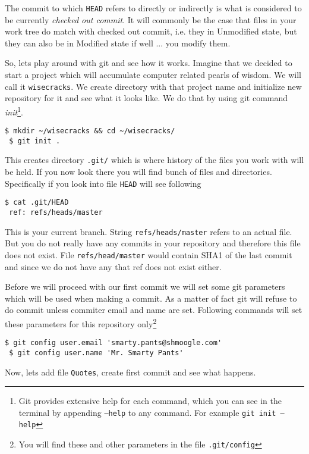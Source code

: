 \documentclass{article}
\theoremstyle{definition}
\begin{document}
        \noindent The commit to which \texttt{HEAD} refers to directly or indirectly is what is considered to be currently
        {\em checked out commit}. It will commonly be the case that files in your work tree do match with checked out
        commit, i.e. they in Unmodified state, but they can also be in Modified state if well ... you modify them.

        So, lets play around with git and see how it works. Imagine that we decided to start a project which will
        accumulate computer related pearls of wisdom. We will call it \texttt{wisecracks}. We create directory with that
        project name and initialize new repository for it and see what it looks like. We do that by using git command
        {\em init}\footnote{Git provides extensive help for each command, which you can see in the terminal by
        appending \texttt{--help} to any command. For example \texttt{git init --help}}.

        \begin{Verbatim}[frame=single]
 $ mkdir ~/wisecracks && cd ~/wisecracks/
 $ git init .
        \end{Verbatim}
        This creates directory \texttt{.git/} which is where history of the files you work with will be held. If you now
        look there you will find bunch of files and directories. Specifically if you look into file \texttt{HEAD} will
        see following

        \begin{Verbatim}[frame=single]
 $ cat .git/HEAD
 ref: refs/heads/master
        \end{Verbatim}
        This is your current branch. String \texttt{refs/heads/master} refers to an actual file. But you do not really have
        any commits in your repository and therefore this file does not exist. File \texttt{refs/head/master} would contain
        SHA1 of the last commit and since we do not have any that ref does not exist either.

        Before we will proceed with our first commit we will set some git parameters which will be used when making a
        commit. As a matter of fact git will refuse to do commit unless commiter email and name are set. Following
        commands will set these parameters for this repository only\footnote{You will find these and other parameters in
        the file \texttt{.git/config}}

        \begin{Verbatim}[frame=single]
 $ git config user.email 'smarty.pants@shmoogle.com'
 $ git config user.name 'Mr. Smarty Pants'
        \end{Verbatim}
        Now, lets add file \texttt{Quotes}, create first commit and see what happens.
\end{document}
